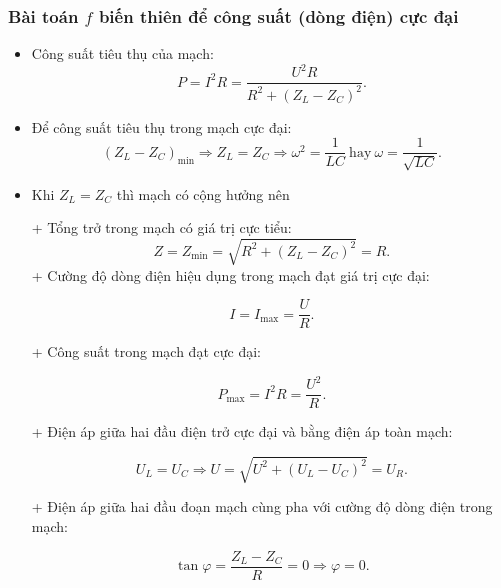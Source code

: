 \subsubsection {Bài toán $f$ biến thiên để công suất (dòng điện) cực đại}
\begin{itemize}
	
	\item  Công suất tiêu thụ của mạch:
	\begin{equation*}
		P=I^2R=\dfrac{U^2R}{R^2+(Z_L-Z_C)^2}.
	\end{equation*}
	\item Để công suất tiêu thụ trong mạch cực đại:
	\begin{equation*}
		(Z_L-Z_C)_{\text{min}} \Rightarrow Z_L =Z_C \Rightarrow \omega^2 =\dfrac{1}{LC}\ \text {hay}\ \omega = \dfrac{1}{\sqrt{LC}}.
	\end{equation*}
	\item Khi $Z_L = Z_C$ thì mạch có cộng hưởng nên
	
	+ Tổng trở trong mạch có giá trị cực tiểu:
	\begin{equation*}
		Z=Z_{\text{min}}=\sqrt {R^2 + (Z_L-Z_C)^2} =R.
	\end{equation*}
	+ Cường độ dòng điện hiệu dụng trong mạch đạt giá trị cực đại:
	
	\begin{equation*}
		I=I_{\text{max}} =\dfrac{U}{R}.
	\end{equation*}
	
	+ Công suất trong mạch đạt cực đại:
	
	\begin{equation*}
		P_{\text{max}} = I^2R =\dfrac{U^2}{R}.
	\end{equation*}
	
	+ Điện áp giữa hai đầu điện trở cực đại và bằng điện áp toàn mạch:
	
	\begin{equation*}
		U_L=U_C \Rightarrow U =\sqrt {U^2 + (U_L-U_C)^2}= U_R.
	\end{equation*}
	
	+ Điện áp giữa hai đầu đoạn mạch cùng pha với cường độ dòng điện trong mạch:
	
	\begin{equation*}
		\tan \varphi = \dfrac{Z_L-Z_C}{R}=0 \Rightarrow \varphi =0.
	\end{equation*}
\end{itemize} 

